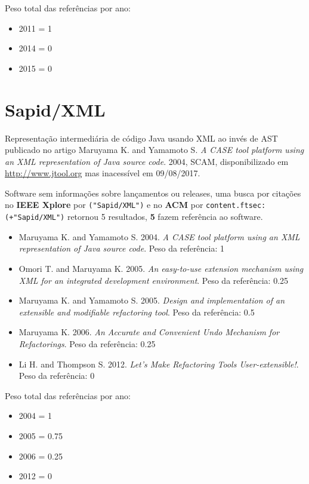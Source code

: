Peso total das referências por ano:

\begin{itemize}
\item 2011 = 1
\item 2014 = 0
\item 2015 = 0
\end{itemize}


\section{Sapid/XML}

Representação intermediária de código Java usando XML ao invés de AST
publicado no artigo
Maruyama K. and Yamamoto S.
{\it A CASE tool platform using an XML representation of Java source code}.
2004,
SCAM,
disponibilizado em \url{http://www.jtool.org}
mas inacessível em 09/08/2017.

Software sem informações sobre lançamentos ou releases,
uma busca por citações no {\bf IEEE Xplore} por
\texttt{("Sapid/XML")}
e no {\bf ACM} por
\texttt{content.ftsec:(+"Sapid/XML")}
retornou
5 resultados,
{\bf 5} fazem referência ao software.

\begin{itemize}
\item Maruyama K. and Yamamoto S.
      2004.
      {\it A CASE tool platform using an XML representation of Java source code}.
      Peso da referência: 1
\item Omori T. and Maruyama K.
      2005.
      {\it An easy-to-use extension mechanism using XML for an integrated development environment}.
      Peso da referência: 0.25
\item Maruyama K. and Yamamoto S.
      2005.
      {\it Design and implementation of an extensible and modifiable refactoring tool}.
      Peso da referência: 0.5
\item Maruyama K.
      2006.
      {\it An Accurate and Convenient Undo Mechanism for Refactorings}.
      Peso da referência: 0.25
\item Li H. and Thompson S.
      2012.
      {\it Let's Make Refactoring Tools User-extensible!}.
      Peso da referência: 0
\end{itemize}

Peso total das referências por ano:

\begin{itemize}
\item 2004 = 1
\item 2005 = 0.75
\item 2006 = 0.25
\item 2012 = 0
\end{itemize}


